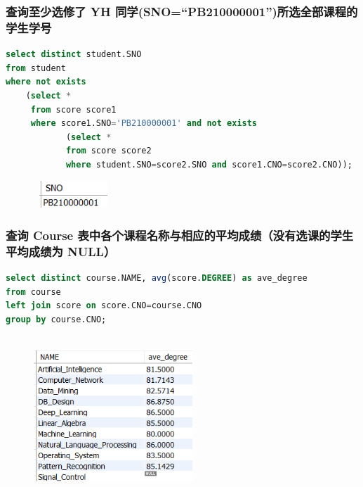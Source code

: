 \documentclass{ctexart}
\begin{document}
\subsubsection{查询至少选修了 YH 同学(SNO=“PB210000001”)所选全部课程的学生学号}
\begin{lstlisting}[language=sql]
select distinct student.SNO
from student
where not exists
	(select *
	 from score score1
     where score1.SNO='PB210000001' and not exists
			(select *
            from score score2
            where student.SNO=score2.SNO and score1.CNO=score2.CNO));
\end{lstlisting}
\begin{figure}[H]
	\centering 
	\includegraphics[height=1cm,width=3cm]{16.png}
	\end{figure}
\subsubsection{查询 Course 表中各个课程名称与相应的平均成绩（没有选课的学生平均成绩为 NULL） }
\begin{lstlisting}[language=sql]
select distinct course.NAME, avg(score.DEGREE) as ave_degree
from course
left join score on score.CNO=course.CNO
group by course.CNO;
\end{lstlisting}
\begin{figure}[H]
	\centering 
	\includegraphics[height=6cm,width=6cm]{39.png}
	\end{figure}
\end{document}
